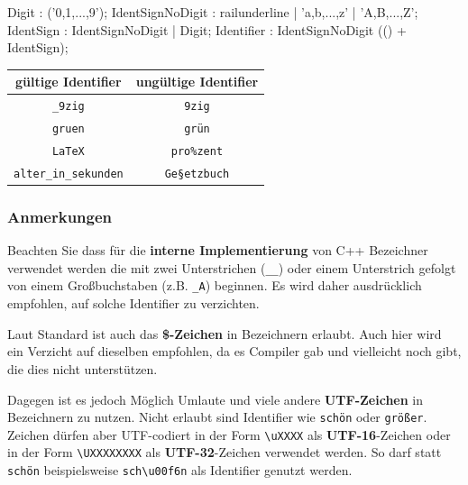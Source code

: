\documentclass[a4paper]{report}
\begin{document}
\begin{multicols}{2}
	\begin{rail}
		Digit : ('0,1,...,9');
		IdentSignNoDigit : railunderline | 'a,b,...,z' | 'A,B,...,Z';
		IdentSign : IdentSignNoDigit | Digit;
		Identifier : IdentSignNoDigit (() + IdentSign);
	\end{rail}
	\vspace{1ex}
	\begin{center}
		\begin{tabular}{|c|c|}
			\hline
			\textbf{gültige Identifier} & \textbf{ungültige Identifier} \\ \hline
			\texttt{\_9zig} & \texttt{9zig} \\
			\texttt{gruen} & \texttt{grün} \\
			\texttt{LaTeX} & \texttt{pro\%zent} \\
			\texttt{alter\_in\_sekunden} & \texttt{Ge\textrm{§}etzbuch} \\
			\hline
		\end{tabular}
	\end{center}
	
	\subsubsection{Anmerkungen}
	Beachten Sie dass für die \textbf{interne Implementierung} von C++ Bezeichner verwendet werden die mit zwei Unterstrichen (\texttt{\_\_}) oder einem Unterstrich gefolgt von einem Großbuchstaben (z.B. \texttt{\_A}) beginnen. Es wird daher ausdrücklich empfohlen, auf solche Identifier zu verzichten.
	
	Laut Standard ist auch das \textbf{\$-Zeichen} in Bezeichnern erlaubt. Auch hier wird ein Verzicht auf dieselben empfohlen, da es Compiler gab und vielleicht noch gibt, die dies nicht unterstützen.
	
	Dagegen ist es jedoch Möglich Umlaute und viele andere \textbf{UTF-Zeichen} in Bezeichnern zu nutzen. Nicht erlaubt sind Identifier wie \texttt{schön} oder \texttt{größer}. Zeichen dürfen aber UTF-codiert in der Form \texttt{\textrm{\textbackslash}uXXXX} als \textbf{UTF-16}-Zeichen oder in der Form \texttt{\textrm{\textbackslash}UXXXXXXXX} als \textbf{UTF-32}-Zeichen verwendet werden. So darf statt \texttt{schön} beispielsweise \texttt{sch\textrm{\textbackslash}u00f6n} als Identifier genutzt werden.
\end{multicols}
\end{document}

